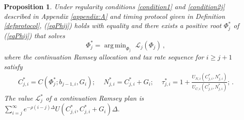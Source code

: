 \documentclass[12pt]{article}
\DeclareMathOperator*{\argmin}{arg\,min}
\newtheorem{proposition}{Proposition}
\begin{document}
\begin{proposition} \label{proplagj} 
	{Under  regularity conditions \ref{condition1} and \ref{condition2j} described in Appendix \ref{appendix:A}} {and timing protocol given in Definition \ref{defprotocol}}, 
	(\ref{eqPhij}) holds with equality and there  exists  a positive root  $\Phi_j^*$ of  (\ref{eqPhij}) that solves
	\begin{equation*}
		\Phi_j^*  = \argmin_{\Phi_j}  \,\,  \mathcal{L}_j(\Phi_j)\, , %
	\end{equation*}	
	where the continuation  Ramsey allocation and tax rate  sequence for $i\geq j+1$ satisfy
	\begin{eqnarray} \label{RamseyCj}
		{C}^\ast_{j, i} =     C(\Phi_j^{*}; b_{j-1, i}, G_{i}); \, \quad  
		{N}^*_{j, i}  =    {C}_{j, i}^\ast +G_{i} ; \,\quad
		{\tau}^*_{j, i} =  1+\frac{U_{N, i}({C}^*_{j, i}, {N}^*_{j, i})}{U_{C, i}({C}^*_{j, i}, {N}^*_{j, i})}; \, .
	\end{eqnarray}
	The value ${\mathcal L}^{*}_j $ of a continuation Ramsey plan is
		$	 \sum_{i=j}^{\infty}  e^{-\rho (i-j)\Delta} U(	{C}^*_{j, i}, {C}^*_{j, i}+G_{i})  \Delta.
		$	%
	\end{proposition}
	
	
\end{document}
